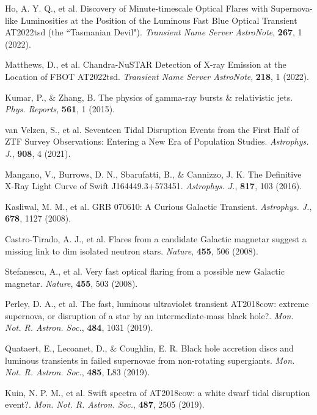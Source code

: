 \documentclass{nature_plusfigure}
\newcommand{\mn}{{Mon. Not. R. Astron. Soc.}}
\newcommand{\physrep}{{Phys. Reports}}
\newcommand{\mnras}{\mn}
\newcommand{\apj}{{Astrophys. J.}}
\newcommand{\nat}{{Nature}}
\begin{document}
\begin{thebibliography}{100}

 Ho, A. Y. Q., et al. Discovery of Minute-timescale Optical Flares with Supernova-like Luminosities at the Position of the Luminous Fast Blue Optical Transient AT2022tsd (the ``Tasmanian Devil"). \emph{Transient Name Server AstroNote}, \textbf{267}, 1 (2022). 

 Matthews, D., et al. Chandra-NuSTAR Detection of X-ray Emission at the Location of FBOT AT2022tsd. \emph{Transient Name Server AstroNote}, \textbf{218}, 1 (2022). 


 Kumar, P., \& Zhang, B. The physics of gamma-ray bursts \& relativistic jets. \emph{\physrep}, \textbf{561}, 1 (2015). 

 van Velzen, S., et al. Seventeen Tidal Disruption Events from the First Half of ZTF Survey Observations: Entering a New Era of Population Studies. \emph{\apj}, \textbf{908}, 4 (2021). 

 Mangano, V., Burrows, D. N., Sbarufatti, B., \& Cannizzo, J. K. The Definitive X-Ray Light Curve of Swift J164449.3+573451. \emph{\apj}, \textbf{817}, 103 (2016). 

 Kasliwal, M. M., et al. GRB 070610: A Curious Galactic Transient. \emph{\apj}, \textbf{678}, 1127 (2008). 

 Castro-Tirado, A. J., et al. Flares from a candidate Galactic magnetar suggest a missing link to dim isolated neutron stars. \emph{\nat}, \textbf{455}, 506 (2008). 

 Stefanescu, A., et al. Very fast optical flaring from a possible new Galactic magnetar. \emph{\nat}, \textbf{455}, 503 (2008). 


 Perley, D. A., et al. The fast, luminous ultraviolet transient AT2018cow: extreme supernova, or disruption of a star by an intermediate-mass black hole?. \emph{\mnras}, \textbf{484}, 1031 (2019). 

 Quataert, E., Lecoanet, D., \& Coughlin, E. R. Black hole accretion discs and luminous transients in failed supernovae from non-rotating supergiants. \emph{\mnras}, \textbf{485}, L83 (2019). 

 Kuin, N. P. M., et al. Swift spectra of AT2018cow: a white dwarf tidal disruption event?. \emph{\mnras}, \textbf{487}, 2505 (2019).


\end{thebibliography}
\end{document}

